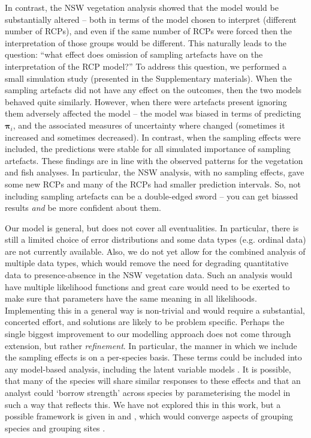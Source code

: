 \documentclass{statsoc}
\newcommand{\vpi}{\bm{\pi}}
\begin{document}
In contrast, the NSW vegetation analysis showed that the model would be substantially altered -- both in terms of the model chosen to interpret (different number of RCPs), and even if the same number of RCPs were forced then the interpretation of those groups would be different. This naturally leads to the question: ``what effect does omission of sampling artefacts have on the interpretation of the RCP model?'' To address this question, we performed a small simulation study (presented in the Supplementary materials). When the sampling artefacts did not have any effect on the outcomes, then the two models behaved quite similarly. However, when there were artefacts present ignoring them adversely affected the model -- the model was biased in terms of predicting $\vpi_i$, and the associated measures of uncertainty where changed (sometimes it increased and sometimes decreased). In contrast, when the sampling effects were included, the predictions were stable for all simulated importance of sampling artefacts. These findings are in line with the observed patterns for the vegetation and fish analyses. In particular, the NSW analysis, with no sampling effects, gave some new RCPs and many of the RCPs had smaller prediction intervals. So, not including sampling artefacts can be a double-edged sword -- you can get biassed results \textit{and} be more confident about them.

Our model is general, but does not cover all eventualities. In particular, there is still a limited choice of error distributions and some data types (e.g. ordinal data) are not currently available. Also, we do not yet allow for the combined analysis of multiple data types, which would remove the need for degrading quantitative data to presence-absence in the NSW vegetation data. Such an analysis would have multiple likelihood functions and great care would need to be exerted to make sure that parameters have the same meaning in all likelihoods. Implementing this in a general way is non-trivial and would require a substantial, concerted effort, and solutions are likely to be problem specific. Perhaps the single biggest improvement to our modelling approach does not come through extension, but rather \textit{refinement}. In particular, the manner in which we include the sampling effects is on a per-species basis. These terms could be included into any model-based analysis, including the latent variable models \citep[e.g.][]{war15a}. It is possible, that many of the species will share similar responses to these effects and that an analyst could `borrow strength' across species by parameterising the model in such a way that reflects this. We have not explored this in this work, but a possible framework is given in \citet{dun11} and \citet{dun13}, which would converge aspects of grouping species and grouping sites \citep[and move towards the bi-clustering of][but based on judicious choices of covariates]{ple14}.
\end{document}
